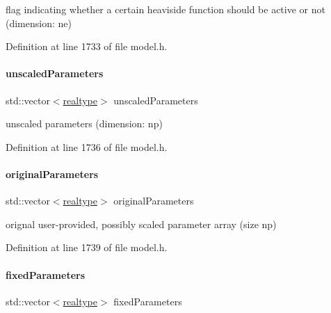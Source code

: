 flag indicating whether a certain heaviside function should be active or not (dimension\+: ne) 

Definition at line 1733 of file model.\+h.

\mbox{\label{classamici_1_1_model_a2f57f75ff99d8bfcabb33c8cda86308d}} 
\paragraph{\texorpdfstring{unscaled\+Parameters}{unscaledParameters}}
{\footnotesize\ttfamily std\+::vector$<$\mbox{\hyperlink{namespaceamici_a1bdce28051d6a53868f7ccbf5f2c14a3}{realtype}}$>$ unscaled\+Parameters\hspace{0.3cm}{\ttfamily [protected]}}

unscaled parameters (dimension\+: np) 

Definition at line 1736 of file model.\+h.

\mbox{\label{classamici_1_1_model_a65d6047f145381b0363ac02feb2433b4}} 
\paragraph{\texorpdfstring{original\+Parameters}{originalParameters}}
{\footnotesize\ttfamily std\+::vector$<$\mbox{\hyperlink{namespaceamici_a1bdce28051d6a53868f7ccbf5f2c14a3}{realtype}}$>$ original\+Parameters\hspace{0.3cm}{\ttfamily [protected]}}

orignal user-\/provided, possibly scaled parameter array (size np) 

Definition at line 1739 of file model.\+h.

\mbox{\label{classamici_1_1_model_ac1d5115134ec1c839f1e913724ceb2b4}} 
\paragraph{\texorpdfstring{fixed\+Parameters}{fixedParameters}}
{\footnotesize\ttfamily std\+::vector$<$\mbox{\hyperlink{namespaceamici_a1bdce28051d6a53868f7ccbf5f2c14a3}{realtype}}$>$ fixed\+Parameters\hspace{0.3cm}{\ttfamily [protected]}}

